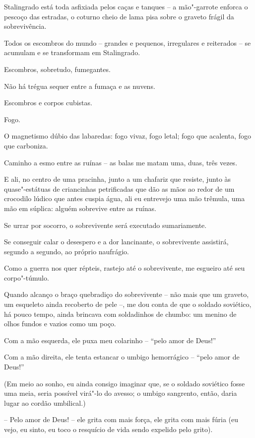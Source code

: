 Stalingrado está toda asfixiada pelos caças e tanques -- a mão"-garrote
enforca o pescoço das estradas, o coturno cheio de lama pisa sobre o
graveto frágil da sobrevivência.

Todos os escombros do mundo -- grandes e pequenos, irregulares e
reiterados -- se acumulam e se transformam em Stalingrado.

Escombros, sobretudo, fumegantes.

Não há trégua sequer entre a fumaça e as nuvens.

Escombros e corpos cubistas.

Fogo.

O magnetismo dúbio das labaredas: fogo vivaz, fogo letal; fogo que
acalenta, fogo que carboniza.

Caminho a esmo entre as ruínas -- as balas me matam uma, duas, três
vezes.

E ali, no centro de uma pracinha, junto a um chafariz que resiste, junto
às quase"-estátuas de criancinhas petrificadas que dão as mãos ao redor
de um crocodilo lúdico que antes cuspia água, ali eu entrevejo uma mão
trêmula, uma mão em súplica: alguém sobrevive entre as ruínas.

Se urrar por socorro, o sobrevivente será executado sumariamente.

Se conseguir calar o desespero e a dor lancinante, o sobrevivente
assistirá, segundo a segundo, ao próprio naufrágio.

Como a guerra nos quer répteis, rastejo até o sobrevivente, me esgueiro
até seu corpo"-túmulo.

Quando alcanço o braço quebradiço do sobrevivente -- não mais que um
graveto, um esqueleto ainda recoberto de pele --, me dou conta de que o
soldado soviético, há pouco tempo, ainda brincava com soldadinhos de
chumbo: um menino de olhos fundos e vazios como um poço.

Com a mão esquerda, ele puxa meu colarinho -- ``pelo amor de Deus!''

Com a mão direita, ele tenta estancar o umbigo hemorrágico -- ``pelo
amor de Deus!''

(Em meio ao sonho, eu ainda consigo imaginar que, se o soldado soviético
fosse uma meia, seria possível virá"-lo do avesso; o umbigo sangrento,
então, daria lugar ao cordão umbilical.)

-- Pelo amor de Deus! -- ele grita com mais força, ele grita com mais
fúria (eu vejo, eu sinto, eu toco o resquício de vida sendo expelido
pelo grito).

